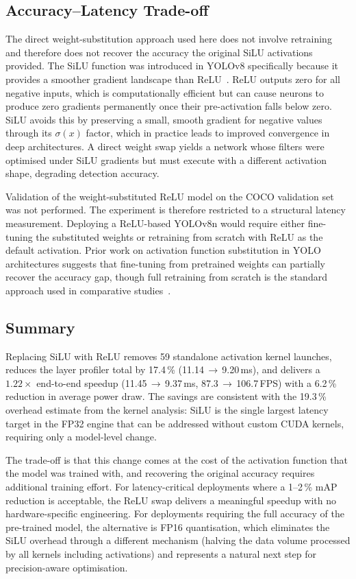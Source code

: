 \documentclass[12pt,a4paper]{report}
\begin{document}
\subsection{Accuracy–Latency Trade-off}

The direct weight-substitution approach used here does not involve retraining and
therefore does not recover the accuracy the original SiLU activations provided.
The SiLU function was introduced in YOLOv8 specifically because it provides a smoother
gradient landscape than ReLU~\cite{ultralytics_silu}. ReLU outputs zero for all negative
inputs, which is computationally efficient but can cause neurons to produce zero gradients
permanently once their pre-activation falls below zero.
SiLU avoids this by preserving a small, smooth gradient for negative values through its
$\sigma(x)$ factor, which in practice leads to improved convergence in deep architectures.
A direct weight swap yields a network whose filters were optimised under SiLU gradients
but must execute with a different activation shape, degrading detection accuracy.

Validation of the weight-substituted ReLU model on the COCO validation set was not
performed.
The experiment is therefore restricted to a structural latency measurement.
Deploying a ReLU-based YOLOv8n would require either fine-tuning the substituted weights
or retraining from scratch with ReLU as the default activation.
Prior work on activation function substitution in YOLO architectures suggests that
fine-tuning from pretrained weights can partially recover the accuracy gap, though
full retraining from scratch is the standard approach used in comparative
studies~\cite{sah2025actnas, li2022yolov6}.

\subsection{Summary}

Replacing SiLU with ReLU removes 59 standalone activation kernel launches, reduces the
layer profiler total by 17.4\,\% (11.14\,$\to$\,9.20\,ms), and delivers a
$1.22\times$ end-to-end speedup (11.45\,$\to$\,9.37\,ms, 87.3\,$\to$\,106.7\,FPS)
with a 6.2\,\% reduction in average power draw.
The savings are consistent with the 19.3\,\% overhead estimate from the kernel analysis:
SiLU is the single largest latency target in the FP32 engine that can be addressed
without custom CUDA kernels, requiring only a model-level change.

The trade-off is that this change comes at the cost of the activation function that
the model was trained with, and recovering the original accuracy requires additional
training effort.
For latency-critical deployments where a 1--2\,\% mAP reduction is acceptable, the
ReLU swap delivers a meaningful speedup with no hardware-specific engineering.
For deployments requiring the full accuracy of the pre-trained model, the alternative
is FP16 quantisation, which eliminates the SiLU overhead through a different mechanism
(halving the data volume processed by all kernels including activations)
and represents a natural next step for precision-aware optimisation.
\end{document}
